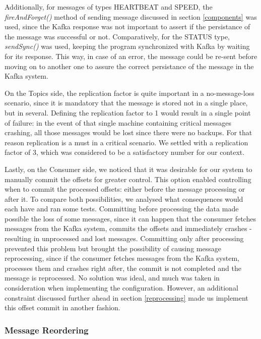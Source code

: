 \documentclass[12pt]{article}
\begin{document}
Additionally, for messages of types HEARTBEAT and SPEED, the \textit{fireAndForget()} method of sending message discussed in section \ref{components} was used, since 
the Kafka response was not important to assert if the persistance of the message was successful or not.
Comparatively, for the STATUS type, \textit{sendSync()} was used, keeping the program synchronized with Kafka by waiting for its response.
This way, in case of an error, the message could be re-sent before moving on to another one to assure the correct persistance of the message in the Kafka system.

On the Topics side, the replication factor is quite important in a no-message-loss scenario, since it is mandatory that the message is stored not in a single 
place, but in several.
Defining the replication factor to 1 would result in a single point of failure: in the event of that single machine containing critical messages crashing, all 
those messages would be lost since there were no backups. 
For that reason replication is a must in a critical scenario. 
We settled with a replication factor of 3, which was considered to be a satisfactory number for our context.

Lastly, on the Consumer side, we noticed that it was desirable for our system to manually commit the offsets for greater control. 
This option enabled controlling when to commit the processed offsets: either before the message processing or after it. 
To compare both possibilities, we analysed what consequences would each have and ran some tests.
Committing before processing the data made possible the loss of some messages, since it can happen that the consumer fetches messages from the Kafka system, 
commits the offsets and immediately crashes - resulting in unprocessed and lost messages.
Committing only after processing prevented this problem but brought the possibility of causing message reprocessing, since if the consumer fetches messages
from the Kafka system, processes them and crashes right after, the commit is not completed and the message is reprocessed.
No solution was ideal, and much was taken in consideration when implementing the configuration.
However, an additional constraint discussed further ahead in section \ref{reprocessing} made us implement this offset commit in another fashion.


\subsubsection{Message Reordering}
\end{document}
